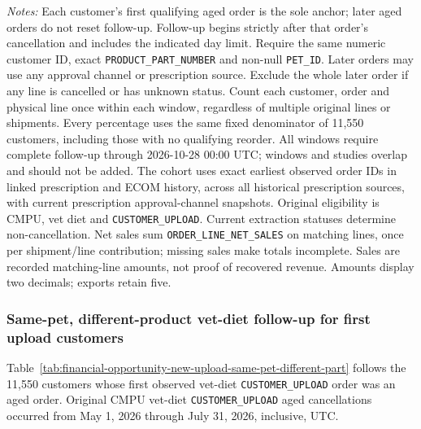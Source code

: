 \begin{table}[!htbp]
\begin{minipage}{\linewidth}
\footnotesize
\textit{Notes:} Each customer's first qualifying aged order is the sole anchor;
later aged orders do not reset follow-up. Follow-up begins strictly after that
order's cancellation and includes the indicated day limit. Require the same
numeric customer ID, exact \texttt{PRODUCT\_PART\_NUMBER} and non-null
\texttt{PET\_ID}. Later orders may use any approval channel or prescription
source. Exclude the whole later order if any line is cancelled or has unknown
status. Count each customer, order and physical line once within each window,
regardless of multiple original lines or shipments. Every percentage uses the
same fixed denominator of 11,550 customers, including those with no
qualifying reorder. All windows require complete follow-up through
2026-10-28 00:00 UTC; windows and studies overlap and should not be added.
The cohort uses exact earliest observed order IDs in linked prescription and
ECOM history, across all historical prescription sources, with current
prescription approval-channel snapshots. Original eligibility is CMPU,
vet diet and \texttt{CUSTOMER\_UPLOAD}. Current extraction statuses determine
non-cancellation. Net sales sum \texttt{ORDER\_LINE\_NET\_SALES} on matching
lines, once per shipment/line contribution; missing sales make totals incomplete.
Sales are recorded matching-line amounts, not proof of recovered revenue.
Amounts display two decimals; exports retain five.
\end{minipage}
\end{table}

\clearpage
\subsubsection{Same-pet, different-product vet-diet follow-up for first upload customers}
Table~\ref{tab:financial-opportunity-new-upload-same-pet-different-part} follows the
11,550 customers whose first observed vet-diet
\texttt{CUSTOMER\_UPLOAD} order was an aged order. Original CMPU vet-diet
\texttt{CUSTOMER\_UPLOAD} aged cancellations occurred from
May 1, 2026 through July 31, 2026, inclusive, UTC.

